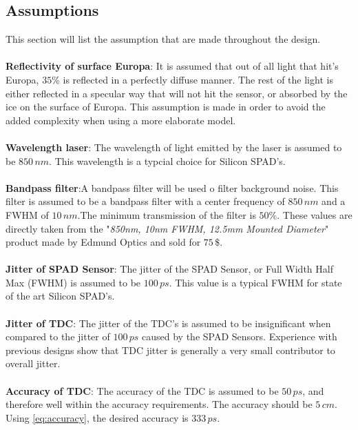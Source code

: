 \subsection{Assumptions} 
\label{ssec:assumptions}
This section will list the assumption that are made throughout the design.\\
\\
\textbf{Reflectivity of surface Europa}: It is assumed that out of all light that hit's Europa, $35\%$ is reflected in a perfectly diffuse manner. The rest of the light is either reflected in a specular way that will not hit the sensor, or absorbed by the ice on the surface of Europa. This assumption is made in order to avoid the added complexity when using a more elaborate model.\\
\\
\textbf{Wavelength laser}: The wavelength of light emitted by the laser is assumed to be $850\,nm$. This wavelength is a typcial choice for Silicon SPAD's. \\
\\
\textbf{Bandpass filter}:A bandpass filter will be used o filter background noise. This filter is assumed to be a bandpass filter with a center frequency of $850\,nm$ and a FWHM of $10\,nm$.The minimum transmission of the filter is $50\%$. These values are directly taken from the "\textit{850nm, 10nm FWHM, 12.5mm Mounted Diameter}" product made by Edmund Optics and sold for $75\,\$$.\\
\\
\textbf{Jitter of SPAD Sensor}: The jitter of the SPAD Sensor, or Full Width Half Max (FWHM) is assumed to be $100\,ps$. This value is a typical FWHM for state of the art Silicon SPAD's. \\
\\
\textbf{Jitter of TDC}: The jitter of the TDC's is assumed to be insignificant when compared to the jitter of $100\,ps$ caused by the SPAD Sensors. Experience with previous designs show that TDC jitter is generally a very small contributor to overall jitter.\\
\\
\textbf{Accuracy of TDC}: The accuracy of the TDC is assumed to be $50\,ps$, and therefore well within the accuracy requirements. The accuracy should be $5\,cm$. Using \cref{eq:accuracy}, the desired accuracy is $333\,ps$. 

